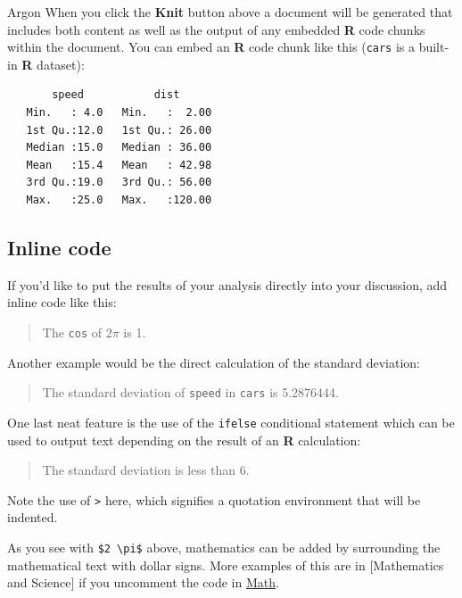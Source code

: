 \documentclass[12pt,twoside]{reedthesis}
\begin{document}
  Argon When you click the \textbf{Knit} button above a document will be
  generated that includes both content as well as the output of any
  embedded \textbf{R} code chunks within the document. You can embed an
  \textbf{R} code chunk like this (\texttt{cars} is a built-in \textbf{R}
  dataset):
  
  \begin{Shaded}
  \begin{Highlighting}[]
  \end{Highlighting}
  \end{Shaded}
  
  \begin{verbatim}
       speed           dist       
   Min.   : 4.0   Min.   :  2.00  
   1st Qu.:12.0   1st Qu.: 26.00  
   Median :15.0   Median : 36.00  
   Mean   :15.4   Mean   : 42.98  
   3rd Qu.:19.0   3rd Qu.: 56.00  
   Max.   :25.0   Max.   :120.00  
  \end{verbatim}
  
  \subsection{Inline code}\label{inline-code}
  
  If you'd like to put the results of your analysis directly into your
  discussion, add inline code like this:
  
  \begin{quote}
  The \texttt{cos} of \(2 \pi\) is 1.
  \end{quote}
  
  Another example would be the direct calculation of the standard
  deviation:
  
  \begin{quote}
  The standard deviation of \texttt{speed} in \texttt{cars} is 5.2876444.
  \end{quote}
  
  One last neat feature is the use of the \texttt{ifelse} conditional
  statement which can be used to output text depending on the result of an
  \textbf{R} calculation:
  
  \begin{quote}
  The standard deviation is less than 6.
  \end{quote}
  
  Note the use of \texttt{\textgreater{}} here, which signifies a
  quotation environment that will be indented.
  
  As you see with \texttt{\$2\ \textbackslash{}pi\$} above, mathematics
  can be added by surrounding the mathematical text with dollar signs.
  More examples of this are in {[}Mathematics and Science{]} if you
  uncomment the code in \protect\hyperlink{math}{Math}.
  
\end{document}
